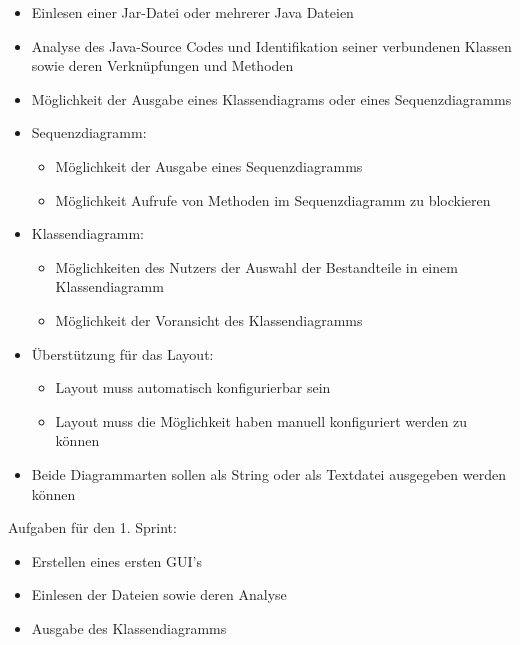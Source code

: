 \begin{itemize}
\item Einlesen einer Jar-Datei oder mehrerer Java Dateien
\item Analyse des Java-Source Codes und Identifikation seiner verbundenen Klassen sowie deren Verknüpfungen und Methoden
\item Möglichkeit der Ausgabe eines Klassendiagrams oder eines Sequenzdiagramms
\item Sequenzdiagramm:
\begin{itemize}
	\item Möglichkeit der Ausgabe eines Sequenzdiagramms
	\item Möglichkeit Aufrufe von Methoden im Sequenzdiagramm zu blockieren
\end{itemize}	
\item Klassendiagramm:
\begin{itemize}
	\item Möglichkeiten des Nutzers der Auswahl der Bestandteile in einem Klassendiagramm
	\item Möglichkeit der Voransicht des Klassendiagramms
\end{itemize}	
\item Überstützung für das Layout:
\begin{itemize}
	\item Layout muss automatisch konfigurierbar sein
	\item Layout muss die Möglichkeit haben manuell konfiguriert werden zu können
\end{itemize}	
\item Beide Diagrammarten sollen als String oder als Textdatei ausgegeben werden können
\end{itemize}

Aufgaben für den 1. Sprint:
\begin{itemize}
\item Erstellen eines ersten GUI’s
\item Einlesen der Dateien sowie deren Analyse
\item Ausgabe des Klassendiagramms
\end{itemize}


